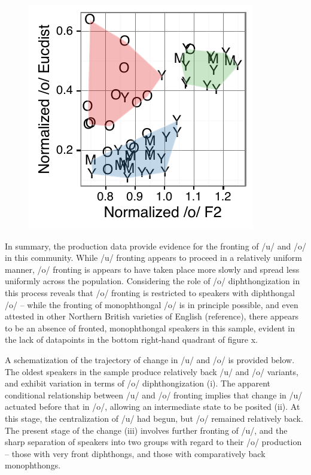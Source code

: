 \documentclass[PWPL]{article}
\begin{document}
\begin{figure}[H]
\centering
\includegraphics[scale=0.7]{ow_front_dip_small.pdf}
\end{figure}

In summary, the production data provide evidence for the fronting of /u/ and /o/ in this community. While /u/ fronting appears to proceed in a relatively uniform manner, /o/ fronting is appears to have taken place more slowly and spread less uniformly across the population. Considering the role of /o/ diphthongization in this process reveals that /o/ fronting is restricted to speakers with diphthongal /o/ -- while the fronting of monophthongal /o/ is in principle possible, and even attested in other Northern British varieties of English (reference), there appears to be an absence of fronted, monophthongal speakers in this sample, evident in the lack of datapoints in the bottom right-hand quadrant of figure x.

A schematization of the trajectory of change in /u/ and /o/ is provided below. The oldest speakers in the sample produce relatively back /u/ and /o/ variants, and exhibit variation in terms of /o/ diphthongization (i). The apparent conditional relationship between /u/ and /o/ fronting implies that change in /u/ actuated before that in /o/, allowing an intermediate state to be posited (ii). At this stage, the centralization of /u/ had begun, but /o/ remained relatively back. The present stage of the change (iii) involves further fronting of /u/, and the sharp separation of speakers into two groups with regard to their /o/ production -- those with very front diphthongs, and those with comparatively back monophthongs. 
\end{document}
